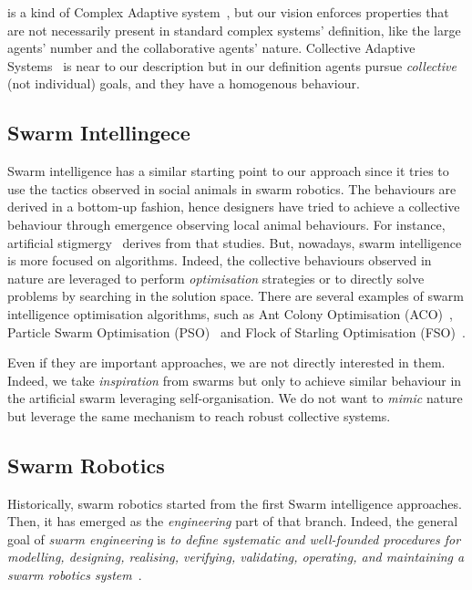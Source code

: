\documentclass[11pt]{article}
\begin{document}
\cpsw{} is a kind of Complex Adaptive system~\cite{holland1992complex}, but our vision enforces properties that are not necessarily present in standard complex systems' definition, like the large agents' number and the collaborative agents' nature.
Collective Adaptive Systems~\cite{DBLP:journals/corr/abs-1108-5643} is near to our \cpsw{} description but in our definition agents pursue \emph{collective} (not individual) goals, and they have a homogenous behaviour.
\subsection{Swarm Intellingece}
Swarm intelligence has a similar starting point to our approach since it tries to use the tactics observed in social animals in swarm robotics. The behaviours are derived in a bottom-up fashion, hence designers have tried to achieve a collective behaviour through emergence observing local animal behaviours.
%
For instance, artificial stigmergy~\cite{DBLP:journals/fgcs/DorigoBT00} derives from that studies. But, nowadays, swarm intelligence is more focused on algorithms. 
Indeed, the collective behaviours observed in nature are leveraged to perform \textit{optimisation} strategies or to directly solve problems by searching in the solution space.
There are several examples of swarm intelligence optimisation algorithms, such as Ant Colony Optimisation (ACO)~\cite{DBLP:journals/tsmc/DorigoMC96}, Particle Swarm Optimisation (PSO)~\cite{DBLP:conf/icnn/KennedyE95} and Flock of Starling Optimisation (FSO)~\cite{DBLP:series/sci/FulgineiS11}.

Even if they are important approaches, we are not directly interested in them. Indeed, we take \textit{inspiration} from swarms but only to achieve similar behaviour in the artificial swarm leveraging self-organisation. We do not want to \textit{mimic} nature but leverage the same mechanism to reach robust collective systems.
\subsection{Swarm Robotics}
Historically, swarm robotics started from the first Swarm intelligence approaches. Then, it has emerged as the \textit{engineering} part of that branch. Indeed, the general goal of \emph{swarm engineering} is \emph{to define systematic and well-founded procedures for modelling, designing, realising, verifying, validating, operating, and maintaining a swarm robotics system}~\cite{DBLP:journals/swarm/BrambillaFBD13}.
\end{document}
